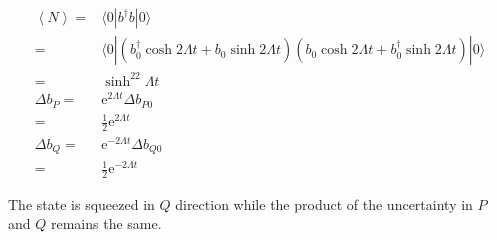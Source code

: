 \documentclass[10pt,fleqn]{article}
\newcommand{\ue}{\mathrm{e}}
\newcommand{\eqar}[1]
{
  \begin{align*}
    #1
  \end{align*}
}
\newcommand{\paren}[1]{{\left({#1}\right)}}
\newcommand{\angl}[1]{{\left\langle{#1}\right\rangle}}
\begin{document}
\subsection{}
\eqar{
  \angl{N}=&\langle0|b^\dagger b|0\rangle\\
  =&\langle0|\paren{b_0^\dagger\cosh2\Lambda t+b_0\sinh2\Lambda t}\paren{b_0\cosh2\Lambda t+b_0^\dagger\sinh2\Lambda t}|0\rangle\\
  =&\sinh^22\Lambda t\\
  \Delta b_P=&\ue^{2\Lambda t}\Delta b_{P0}\\
  =&\frac12\ue^{2\Lambda t}\\
  \Delta b_Q=&\ue^{-2\Lambda t}\Delta b_{Q0}\\
  =&\frac12\ue^{-2\Lambda t}
}
The state is squeezed in $Q$ direction while the product of the uncertainty in $P$ and $Q$ remains the same.
\end{document}

